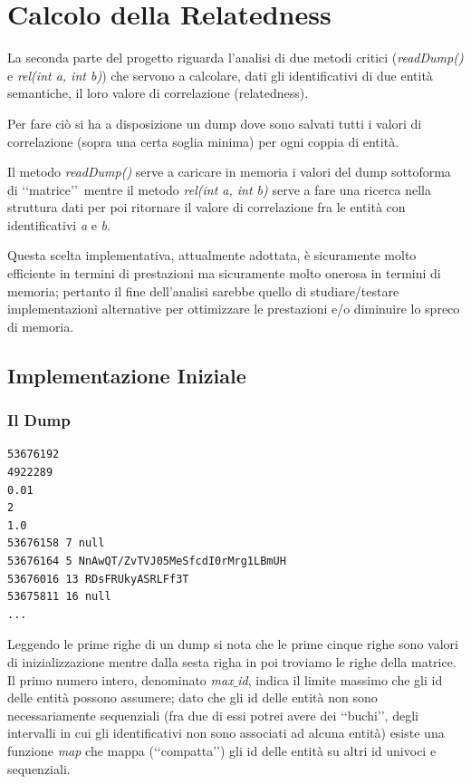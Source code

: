 \chapter{Calcolo della Relatedness}

La seconda parte del progetto riguarda l'analisi di due metodi critici (\textit{readDump()} e \textit{rel(int a, int b)}) che servono a 
calcolare, dati gli identificativi di due entità semantiche, il loro valore di correlazione (relatedness). 

Per fare ciò si ha a disposizione un dump dove sono salvati tutti i valori di correlazione (sopra una certa soglia minima) per ogni coppia di entità. 

Il metodo \textit{readDump()} serve a caricare in memoria i valori del dump 
sottoforma di \lq\lq matrice\rq\rq\ mentre il metodo \textit{rel(int a, int b)} serve a fare una ricerca nella struttura dati per poi ritornare il valore di 
correlazione fra le entità con identificativi \textit{a} e \textit{b}.

Questa scelta implementativa, attualmente adottata, è sicuramente molto efficiente in termini di prestazioni ma sicuramente molto onerosa in termini di memoria; 
pertanto il fine dell'analisi sarebbe quello di studiare/testare implementazioni alternative per ottimizzare le prestazioni e/o diminuire lo spreco di memoria.  

\section{Implementazione Iniziale}

\subsection{Il Dump}
\begin{lstlisting}[style=TeXStyle]
53676192
4922289
0.01
2
1.0
53676158 7 null
53676164 5 NnAwQT/ZvTVJ05MeSfcdI0rMrg1LBmUH
53676016 13 RDsFRUkyASRLFf3T
53675811 16 null
...
\end{lstlisting}

Leggendo le prime righe di un dump si nota che le prime cinque righe sono valori di inizializzazione mentre dalla sesta righa in poi troviamo le righe della matrice.
Il primo numero intero, denominato \textit{max$\_$id}, indica il limite massimo che gli id delle entità possono assumere; 
dato che gli id delle entità non sono necessariamente sequenziali 
(fra due di essi potrei avere dei \lq\lq buchi\rq\rq, degli intervalli in cui gli identificativi non sono associati ad alcuna entità) 
esiste una funzione \textit{map} che mappa (\lq\lq compatta\rq\rq) gli id delle entità su altri id univoci e sequenziali. 

